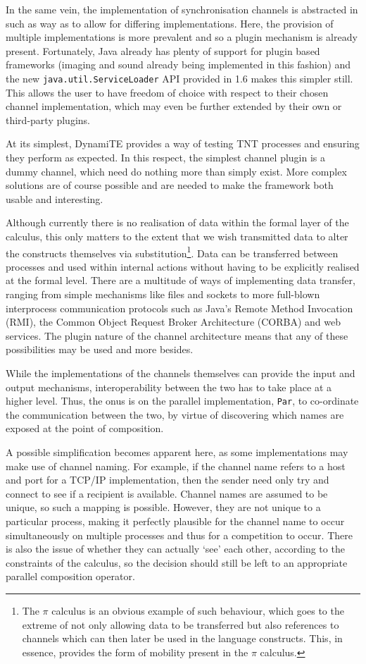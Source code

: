 \documentclass{acm_proc_article-sp}
\begin{document}
In the same vein, the implementation of synchronisation channels is
abstracted in such as way as to allow for differing implementations.
Here, the provision of multiple implementations is more prevalent and so
a plugin mechanism is already present.  Fortunately, Java already has
plenty of support for plugin based frameworks (imaging and sound already
being implemented in this fashion) and the new
\texttt{java.util.ServiceLoader} API provided in 1.6 makes this simpler
still.  This allows the user to have freedom of choice with respect to
their chosen channel implementation, which may even be further extended
by their own or third-party plugins.

At its simplest, DynamiTE provides a way of testing TNT processes and
ensuring they perform as expected.  In this respect, the simplest
channel plugin is a dummy channel, which need do nothing more than
simply exist.  More complex solutions are of course possible and are
needed to make the framework both usable and interesting.  

Although currently there is no realisation of data within the formal
layer of the calculus, this only matters to the extent that we wish
transmitted data to alter the constructs themselves via
substitution\footnote{The $\pi$ calculus \cite{picalctutorial} is an
obvious example of such behaviour, which goes to the extreme of not only
allowing data to be transferred but also references to channels which
can then later be used in the language constructs.  This, in essence,
provides the form of mobility present in the $\pi$ calculus.}.  Data can
be transferred between processes and used within internal actions
without having to be explicitly realised at the formal level.  There are
a multitude of ways of implementing data transfer, ranging from simple
mechanisms like files and sockets to more full-blown interprocess
communication protocols such as Java's Remote Method Invocation (RMI),
the Common Object Request Broker Architecture (CORBA) and web services.
The plugin nature of the channel architecture means that any of these
possibilities may be used and more besides.

While the implementations of the channels themselves can provide the
input and output mechanisms, interoperability between the two has to
take place at a higher level.  Thus, the onus is on the parallel
implementation, \texttt{Par}, to co-ordinate the communication between
the two, by virtue of discovering which names are exposed at the point
of composition.

A possible simplification becomes apparent here, as some implementations
may make use of channel naming.  For example, if the channel name refers
to a host and port for a TCP/IP implementation, then the sender need
only try and connect to see if a recipient is available.  Channel names
are assumed to be unique, so such a mapping is possible.  However, they
are not unique to a particular process, making it perfectly plausible
for the channel name to occur simultaneously on multiple processes and
thus for a competition to occur.  There is also the issue of whether
they can actually `see' each other, according to the constraints of the
calculus, so the decision should still be left to an appropriate
parallel composition operator.
\end{document}

